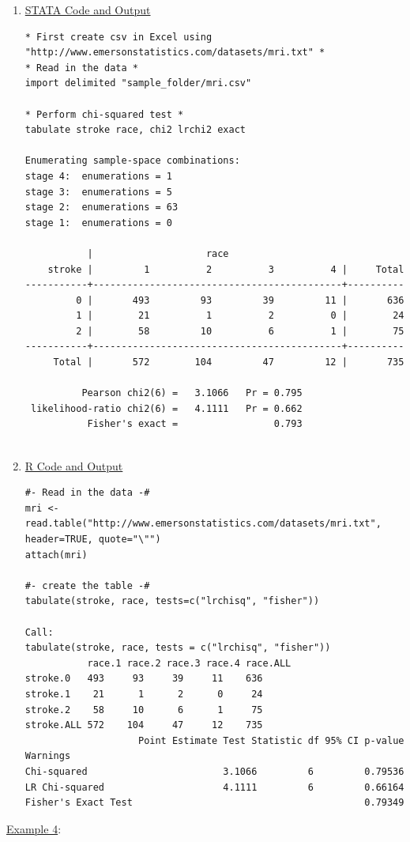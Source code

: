 \documentclass[11pt,letterpaper,fleqn]{report}
\begin{document}
\begin{enumerate}[]
\item \underline{STATA Code and Output}
{\scriptsize
\begin{verbatim}
* First create csv in Excel using "http://www.emersonstatistics.com/datasets/mri.txt" *
* Read in the data *
import delimited "sample_folder/mri.csv"

* Perform chi-squared test *
tabulate stroke race, chi2 lrchi2 exact

Enumerating sample-space combinations:
stage 4:  enumerations = 1
stage 3:  enumerations = 5
stage 2:  enumerations = 63
stage 1:  enumerations = 0

           |                    race
    stroke |         1          2          3          4 |     Total
-----------+--------------------------------------------+----------
         0 |       493         93         39         11 |       636 
         1 |        21          1          2          0 |        24 
         2 |        58         10          6          1 |        75 
-----------+--------------------------------------------+----------
     Total |       572        104         47         12 |       735 

          Pearson chi2(6) =   3.1066   Pr = 0.795
 likelihood-ratio chi2(6) =   4.1111   Pr = 0.662
           Fisher's exact =                 0.793


\end{verbatim}}


\item \underline{R Code and Output}
{\scriptsize
\begin{verbatim}
#- Read in the data -#
mri <- read.table("http://www.emersonstatistics.com/datasets/mri.txt", header=TRUE, quote="\"")
attach(mri)

#- create the table -#
tabulate(stroke, race, tests=c("lrchisq", "fisher"))

Call:
tabulate(stroke, race, tests = c("lrchisq", "fisher"))
           race.1 race.2 race.3 race.4 race.ALL
stroke.0   493     93     39     11    636     
stroke.1    21      1      2      0     24     
stroke.2    58     10      6      1     75     
stroke.ALL 572    104     47     12    735     
                    Point Estimate Test Statistic df 95% CI p-value Warnings
Chi-squared                        3.1066         6         0.79536         
LR Chi-squared                     4.1111         6         0.66164         
Fisher's Exact Test                                         0.79349 
\end{verbatim}}

\end{enumerate}
\underline{Example 4}:
\end{document}
